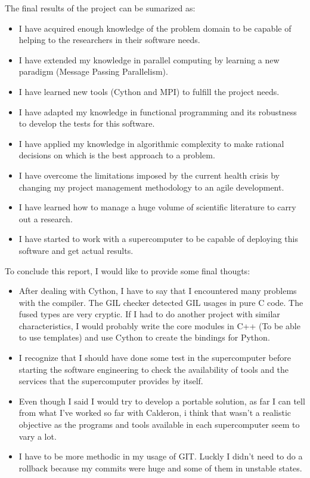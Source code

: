 \documentclass{tfg_domingo}
\begin{document}
  The final results of the project can be sumarized as:
  \begin{itemize}
    \item I have acquired enough knowledge of the problem domain
    to be capable of helping to the researchers in their software needs.
    \item I have extended my knowledge in parallel computing by learning a
    new paradigm (Message Passing Parallelism).
    \item I have learned new tools (Cython and MPI) to fulfill the
    project needs.
    \item I have adapted my knowledge in functional programming and its
    robustness to develop the tests for this software.
    \item I have applied my knowledge in algorithmic complexity to make
    rational decisions on which is the best approach to a problem.
    \item I have overcome the limitations imposed by the current health crisis
    by changing my project management methodology to an agile development.
    \item I have learned how to manage a huge volume of scientific literature
    to carry out a research.
    \item I have started to work with a supercomputer to be capable of
    deploying this software and get actual results.
  \end{itemize}

  To conclude this report, I would like to provide some final thougts:
  \begin{itemize}

    \item After dealing with Cython, I have to say that I encountered many
    problems with the compiler. The GIL checker detected GIL usages in pure C
    code. The fused types are very cryptic. If I had to do another project
    with similar characteristics, I would probably write the core modules in
    C++ (To be able to use templates) and use Cython to create the
    bindings for Python.

    \item I recognize that I should have done some test in the supercomputer
    before starting the software engineering to check the availability
    of tools and the services that the supercomputer provides by itself.

    \item Even though I said I would try to develop a portable solution, as
    far I can tell from what I've worked so far with Calderon, i think that
    wasn't a realistic objective as the programs and tools available in each
    supercomputer seem to vary a lot.

    \item I have to be more methodic in my usage of GIT. Luckly I didn't need
    to do a rollback because my commits were huge and some of them in unstable
    states.

  \end{itemize}




\backmatter

\end{document}
